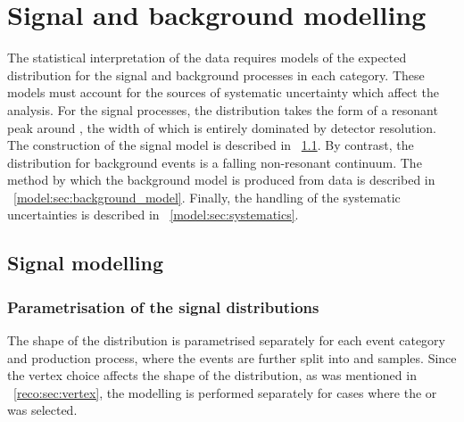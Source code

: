 \chapter{Signal and background modelling}
\label{chap:model}

The statistical interpretation of the data requires models of the expected \mgg distribution for the signal and background processes in each category. These models must account for the sources of systematic uncertainty which affect the analysis. %
For the signal processes, the \mgg distribution takes the form of a resonant peak around \mH, the width of which is entirely dominated by detector resolution. The construction of the signal model is described in \Sec~\ref{model:sec:signal_model}. By contrast, the \mgg distribution for background events is a falling non-resonant continuum. The method by which the background model is produced from data is described in \Sec~\ref{model:sec:background_model}. Finally, the handling of the systematic uncertainties is described in \Sec~\ref{model:sec:systematics}. 

\section{Signal modelling}
\label{model:sec:signal_model}

\subsection{Parametrisation of the signal \mgg distributions}

The shape of the \mgg distribution is parametrised separately for each event category and production process, where the \VH events are further split into \WH and \ZH samples. Since the vertex choice affects the shape of the \mgg  distribution, as was mentioned in \Sec~\ref{reco:sec:vertex}, the modelling is performed separately for cases where the \RV or \WV  was selected. 


